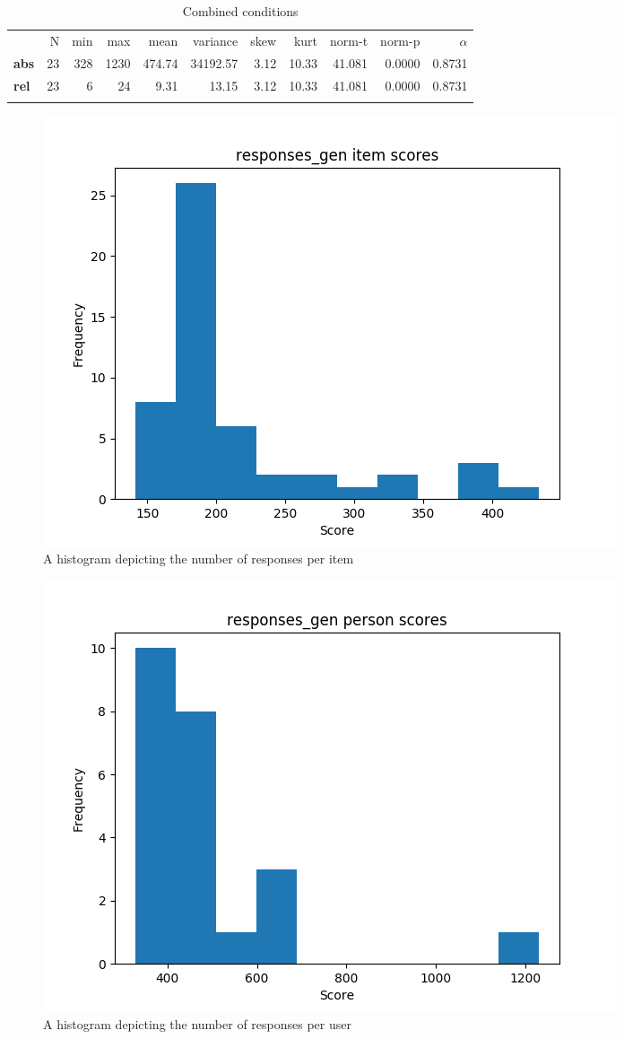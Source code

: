 \begin{longtable}[c]{@{}lrrrrrrrrrr@{}}
\caption{Combined conditions}
\endfirsthead
\toprule\addlinespace
& N & min & max & mean & variance & skew & kurt & norm-t &
norm-p & $\alpha$
\\\addlinespace
\midrule
\textbf{abs} & 23 & 328 & 1230 & 474.74 & 34192.57 & 3.12 & 10.33 &
41.081 & 0.0000 & 0.8731
\\\addlinespace
\textbf{rel} & 23 & 6 & 24 & 9.31 & 13.15 & 3.12 & 10.33 & 41.081 &
0.0000 & 0.8731
\\\addlinespace
\bottomrule
    \label{tab:responses_gen}
\end{longtable}

\begin{figure}
    \centering
    \includegraphics[width=.7\textwidth]{img/responses_gen_diff.png}
    \caption{A histogram depicting the number of responses per item}
    \label{fig:responses_gen_diff}
\end{figure}
\begin{figure}
    \centering
    \includegraphics[width=.7\textwidth]{img/responses_gen_abil.png}
    \caption{A histogram depicting the number of responses per user}
    \label{fig:responses_gen_abil}
\end{figure}

